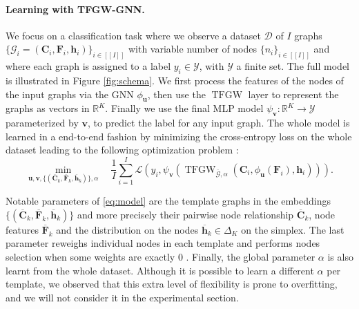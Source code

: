 \documentclass{article}
\def\vh{{\bm{h}}}
\def\vu{{\bm{u}}}
\def\vv{{\bm{v}}}
\def\mC{{\bm{C}}}
\def\mF{{\bm{F}}}
\newcommand{\TFGW}{\operatorname{TFGW}}
\newcommand{\integ}[1]{{[\![#1]\!]}}
\begin{document}
\paragraph{Learning with TFGW-GNN.} We focus on a classification
task where we observe a dataset $\mathcal{D}$ of $I$ graphs
$\{\mathcal{G}_i = ( \mC_i, \mF_i, \vh_i)\}_{i \in \integ{I}}$ with variable
number of nodes $\{n_i\}_{i \in \integ{I}}$ and where each graph is assigned to a label $y_i \in \mathcal{Y}$, with
$\mathcal{Y}$ a finite set. The full model is illustrated in
Figure \ref{fig:schema}. We first process the features of the nodes of the input graphs via the GNN
$\phi_{\vu}$, then use the $\TFGW$ layer to represent the graphs as
vectors in $\mathbb{R}^K$. Finally we use the final MLP model $\psi_{\vv} : \mathbb{R}^K
\rightarrow \mathcal{Y}$ parameterized by $\vv$, to predict the label for any input graph. 
The whole model is learned in a end-to-end fashion by minimizing the cross-entropy loss on the whole
dataset leading to the following optimization problem :
\begin{equation}\label{eq:model}
	\min_{ \vu, \vv, \{ (\overline{\mC}_k, \overline{\mF}_k, \overline{\vh}_k)\},\alpha} \quad\frac{1}{I}\sum_{i =1}^I \mathcal{L}\left(y_i, \psi_{\vv}\left(\TFGW_{\overline{\mathcal{G}},\alpha}\left(\mC_i, \phi_{\vu}(\mF_i), \vh_i \right) \right) \right).
\end{equation}


Notable parameters of \eqref{eq:model} are the template graphs in the embeddings $ \{
(\overline{\mC}_k, \overline{\mF}_k, \overline{\vh}_k)\}$ and more precisely
their pairwise node relationship $\overline{\mC}_k$, node features
$\overline{\mF}_k$ and the distribution on the nodes
$\overline{\vh}_k\in\Delta_K$ on the simplex. The last parameter
reweighs individual nodes in each template and performs nodes selection
when some weights are exactly $0$ \cite{vincent2021online, vincent-cuaz2022semirelaxed}. Finally, the global parameter $\alpha$
is also learnt from the whole dataset.
Although it is possible to learn a different $\alpha$ per template, we observed that this extra level of flexibility is prone to overfitting, and we will not consider it in the experimental section.





 
\end{document}

